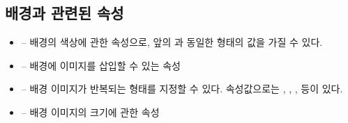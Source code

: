 \subsection*{배경과 관련된 속성}

\begin{itemize}
    \item {} – 배경의 색상에 관한 속성으로, 앞의 과 동일한 형태의 값을 가질 수 있다.
    \item {} – 배경에 이미지를 삽입할 수 있는 속성
    \item {} – 배경 이미지가 반복되는 형태를 지정할 수 있다. 속성값으로는 , , ,  등이 있다.
    \item {} – 배경 이미지의 크기에 관한 속성
\end{itemize}
